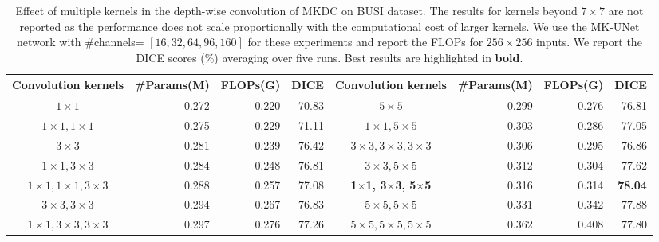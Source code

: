 \begin{table}[t]
\centering 
    {%
\begin{adjustbox}{width=0.8\textwidth}
{\begin{tabular}{crrr|crrr}
\toprule
Convolution kernels & \#Params(M) & FLOPs(G) & DICE & Convolution kernels & \#Params(M) & FLOPs(G) & DICE\\
\midrule
$1\times1$           & 0.272 & 0.220 & 70.83 & $5\times5$           & 0.299 & 0.276 & 76.81 \\
$1\times1, 1\times1$         & 0.275 & 0.229 & 71.11 & $1\times1, 5\times5$         & 0.303 & 0.286 & 77.05 \\
$3\times3$           & 0.281 & 0.239 & 76.42 & $3\times3, 3\times3, 3\times3$       & 0.306 & 0.295 & 76.86 \\
$1\times1, 3\times3$         & 0.284 & 0.248 & 76.81 & $3\times3, 5\times5$         & 0.312 & 0.304 & 77.62 \\
$1\times1, 1\times1, 3\times3$       & 0.288 & 0.257 & 77.08 & \textbf{1$\times$1, 3$\times$3, 5$\times$5}       & 0.316 & 0.314 & \textbf{78.04} \\
$3\times3, 3\times3$         & 0.294 & 0.267 & 76.83 & $5\times5, 5\times5$         & 0.331 & 0.342 & 77.88 \\
$1\times1, 3\times3, 3\times3$       & 0.297 & 0.276 & 77.26 & $5\times5, 5\times5, 5\times5$       & 0.362 & 0.408 & 77.80 \\
\bottomrule
\end{tabular}}
\end{adjustbox}
}%
\vspace{-0.2cm}
\caption{Effect of multiple kernels in the depth-wise convolution of MKDC on BUSI dataset. The results for kernels beyond $7\times7$ are not reported as the performance does not scale proportionally with the computational cost of larger kernels. We use the MK-UNet network with \#channels= $[16,32,64,96,160]$ for these experiments and report the FLOPs for $256\times256$ inputs. We report the DICE scores (\%) averaging over five runs. Best results are highlighted in \textbf{bold}.}
\label{tab:multi_kernels}
\vspace{-0.2cm}
\end{table}


